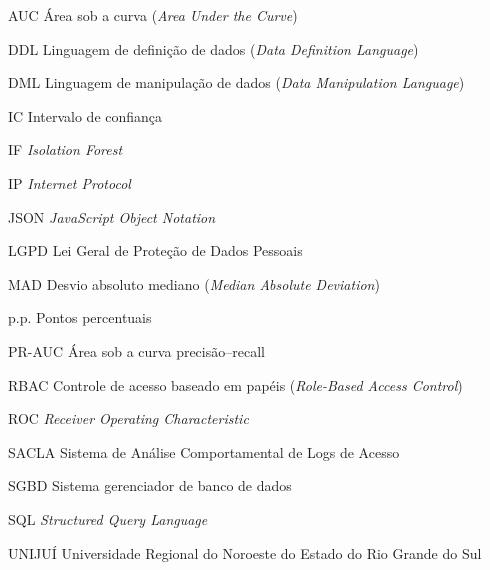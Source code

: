 \documentclass[
    12pt,               %
    oneside,            %
    a4paper,            %
    chapter=TITLE,      %
    section=TITLE,      %
    english,            %
    brazil,             %
    article             %
]{abntex2}
\begin{document}
\begin{siglas}
    \item[AUC] Área sob a curva (\textit{Area Under the Curve})
    \item[DDL] Linguagem de definição de dados (\textit{Data Definition Language})
    \item[DML] Linguagem de manipulação de dados (\textit{Data Manipulation Language})
    \item[IC] Intervalo de confiança
    \item[IF] \textit{Isolation Forest}
    \item[IP] \textit{Internet Protocol}
    \item[JSON] \textit{JavaScript Object Notation}
    \item[LGPD] Lei Geral de Proteção de Dados Pessoais
    \item[MAD] Desvio absoluto mediano (\textit{Median Absolute Deviation})
    \item[p.p.] Pontos percentuais
    \item[PR-AUC] Área sob a curva precisão--recall
    \item[RBAC] Controle de acesso baseado em papéis (\textit{Role-Based Access Control})
    \item[ROC] \textit{Receiver Operating Characteristic}
    \item[SACLA] Sistema de Análise Comportamental de Logs de Acesso
    \item[SGBD] Sistema gerenciador de banco de dados
    \item[SQL] \textit{Structured Query Language}
    \item[UNIJUÍ] Universidade Regional do Noroeste do Estado do Rio Grande do Sul
\end{siglas}

\tableofcontents*
\cleardoublepage


\begin{apresentacao}
    \imprimirapresentacao
\end{apresentacao}
\newpage

\imprimirpaginaresumos


\textual






\end{document}
